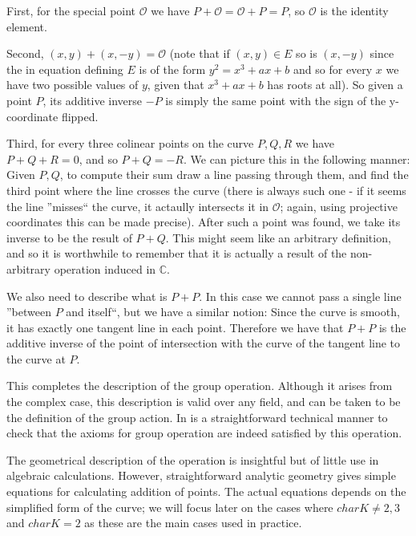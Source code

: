 \documentclass[11pt,english]{article}
\begin{document}
First, for the special point $\mathcal{O}$ we have $P+\mathcal{O}=\mathcal{O}+P=P$, so $\mathcal{O}$ is the identity element.

Second, $(x,y)+(x,-y)=\mathcal{O}$ (note that if $(x,y)\in E$ so is $(x,-y)$ since the in equation defining $E$ is of the form $y^2=x^3+ax+b$ and so for
every $x$ we have two possible values of $y$, given that $x^3+ax+b$ has roots at all). So given a point $P$, its additive inverse $-P$ is simply the same point
with the sign of the y-coordinate flipped.

Third, for every three colinear points on the curve $P,Q,R$ we have $P+Q+R=0$, and so $P+Q=-R$. We can picture this in the following manner: Given $P,Q$,
to compute their sum draw a line passing through them, and find the third point where the line crosses the curve (there is always such one - if it seems the line 
''misses`` the curve, it actaully intersects it in $\mathcal{O}$; again, using projective coordinates this can be made precise). After such a point was found, we
take its inverse to be the result of $P+Q$. This might seem like an arbitrary definition, and so it is worthwhile to remember that it is actually a result of the non-arbitrary
operation induced in $\mathbb{C}$.

We also need to describe what is $P+P$. In this case we cannot pass a single line ''between $P$ and itself``, but we have a similar notion: Since the curve is smooth,
it has exactly one tangent line in each point. Therefore we have that $P+P$ is the additive inverse of the point of intersection with the curve of the tangent line to the curve at $P$.

This completes the description of the group operation. Although it arises from the complex case, this description is valid over any field, and can be taken to be
the definition of the group action. In is a straightforward technical manner to check that the axioms for group operation are indeed satisfied by this operation.

The geometrical description of the operation is insightful but of little use in algebraic calculations. However, straightforward analytic geometry
gives simple equations for calculating addition of points. The actual equations depends on the simplified form of the curve; we will focus later on the cases
where $charK\ne 2,3$ and $charK=2$ as these are the main cases used in practice.
\end{document}
